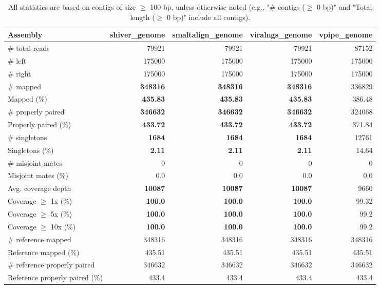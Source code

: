 \documentclass[12pt,a4paper]{article}
\begin{document}
\begin{table}[ht]
\begin{center}
\caption{All statistics are based on contigs of size $\geq$ 100 bp, unless otherwise noted (e.g., "\# contigs ($\geq$ 0 bp)" and "Total length ($\geq$ 0 bp)" include all contigs).}
\begin{tabular}{|l*{4}{|r}|}
\hline
Assembly & shiver\_genome & smaltalign\_genome & viralngs\_genome & vpipe\_genome \\ \hline
\# total reads & 79921 & 79921 & 79921 & 87152 \\ \hline
\# left & 175000 & 175000 & 175000 & 175000 \\ \hline
\# right & 175000 & 175000 & 175000 & 175000 \\ \hline
\# mapped & {\bf 348316} & {\bf 348316} & {\bf 348316} & 336829 \\ \hline
Mapped (\%) & {\bf 435.83} & {\bf 435.83} & {\bf 435.83} & 386.48 \\ \hline
\# properly paired & {\bf 346632} & {\bf 346632} & {\bf 346632} & 324068 \\ \hline
Properly paired (\%) & {\bf 433.72} & {\bf 433.72} & {\bf 433.72} & 371.84 \\ \hline
\# singletons & {\bf 1684} & {\bf 1684} & {\bf 1684} & 12761 \\ \hline
Singletons (\%) & {\bf 2.11} & {\bf 2.11} & {\bf 2.11} & 14.64 \\ \hline
\# misjoint mates & 0 & 0 & 0 & 0 \\ \hline
Misjoint mates (\%) & 0.0 & 0.0 & 0.0 & 0.0 \\ \hline
Avg. coverage depth & {\bf 10087} & {\bf 10087} & {\bf 10087} & 9660 \\ \hline
Coverage $\geq$ 1x (\%) & {\bf 100.0} & {\bf 100.0} & {\bf 100.0} & 99.32 \\ \hline
Coverage $\geq$ 5x (\%) & {\bf 100.0} & {\bf 100.0} & {\bf 100.0} & 99.2 \\ \hline
Coverage $\geq$ 10x (\%) & {\bf 100.0} & {\bf 100.0} & {\bf 100.0} & 99.2 \\ \hline
\# reference mapped & 348316 & 348316 & 348316 & 348316 \\ \hline
Reference mapped (\%) & 435.51 & 435.51 & 435.51 & 435.51 \\ \hline
\# reference properly paired & 346632 & 346632 & 346632 & 346632 \\ \hline
Reference properly paired (\%) & 433.4 & 433.4 & 433.4 & 433.4 \\ \hline

\end{tabular}
\end{center}
\end{table}
\end{document}
